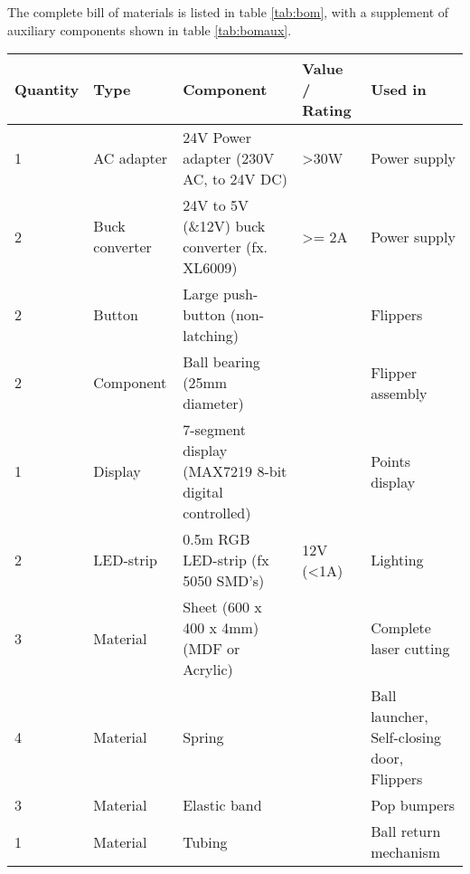The complete bill of materials is listed in table \ref{tab:bom}, with a supplement of auxiliary components shown in table \ref{tab:bomaux}.

\begin{table*}[]
\centering
\begin{tabular}{@{}lllll@{}}
\toprule
\textbf{Quantity} & \textbf{Type}  & \textbf{Component}                                   & \textbf{Value / Rating} & \textbf{Used in}                           \\ \midrule
1                 & AC adapter     & 24V Power adapter (230V AC, to 24V DC)               & \textgreater 30W        & Power supply                               \\
2                 & Buck converter & 24V to 5V (\&12V) buck converter (fx. XL6009)        & \textgreater{}= 2A      & Power supply                               \\
2                 & Button         & Large push-button (non-latching)                     &                         & Flippers                                   \\
2                 & Component      & Ball bearing (25mm diameter)                         &                         & Flipper assembly                           \\
1                 & Display        & 7-segment display (MAX7219 8-bit digital controlled) &                         & Points display                             \\
2                 & LED-strip      & 0.5m RGB LED-strip (fx 5050 SMD's)                   & 12V (\textless 1A)      & Lighting                                   \\
3                 & Material       & Sheet (600 x 400 x 4mm) (MDF or Acrylic)             &                         & Complete laser cutting                     \\
4                 & Material       & Spring                                               &                         & Ball launcher, Self-closing door, Flippers \\
3                 & Material       & Elastic band                                         &                         & Pop bumpers                                \\
1                 & Material       & Tubing                                               &                         & Ball return mechanism                      \\

\end{tabular}
\end{table*}
